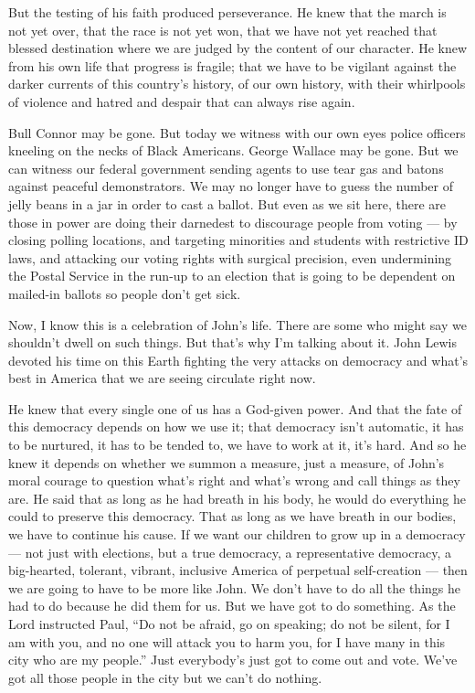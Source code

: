 But the testing of his faith produced perseverance. He knew that the
march is not yet over, that the race is not yet won, that we have not
yet reached that blessed destination where we are judged by the content
of our character. He knew from his own life that progress is fragile;
that we have to be vigilant against the darker currents of this
country's history, of our own history, with their whirlpools of violence
and hatred and despair that can always rise again.

Bull Connor may be gone. But today we witness with our own eyes police
officers kneeling on the necks of Black Americans. George Wallace may be
gone. But we can witness our federal government sending agents to use
tear gas and batons against peaceful demonstrators. We may no longer
have to guess the number of jelly beans in a jar in order to cast a
ballot. But even as we sit here, there are those in power are doing
their darnedest to discourage people from voting --- by closing polling
locations, and targeting minorities and students with restrictive ID
laws, and attacking our voting rights with surgical precision, even
undermining the Postal Service in the run-up to an election that is
going to be dependent on mailed-in ballots so people don't get sick.

Now, I know this is a celebration of John's life. There are some who
might say we shouldn't dwell on such things. But that's why I'm talking
about it. John Lewis devoted his time on this Earth fighting the very
attacks on democracy and what's best in America that we are seeing
circulate right now.

He knew that every single one of us has a God-given power. And that the
fate of this democracy depends on how we use it; that democracy isn't
automatic, it has to be nurtured, it has to be tended to, we have to
work at it, it's hard. And so he knew it depends on whether we summon a
measure, just a measure, of John's moral courage to question what's
right and what's wrong and call things as they are. He said that as long
as he had breath in his body, he would do everything he could to
preserve this democracy. That as long as we have breath in our bodies,
we have to continue his cause. If we want our children to grow up in a
democracy --- not just with elections, but a true democracy, a
representative democracy, a big-hearted, tolerant, vibrant, inclusive
America of perpetual self-creation --- then we are going to have to be
more like John. We don't have to do all the things he had to do because
he did them for us. But we have got to do something. As the Lord
instructed Paul, ``Do not be afraid, go on speaking; do not be silent,
for I am with you, and no one will attack you to harm you, for I have
many in this city who are my people.'' Just everybody's just got to come
out and vote. We've got all those people in the city but we can't do
nothing.

